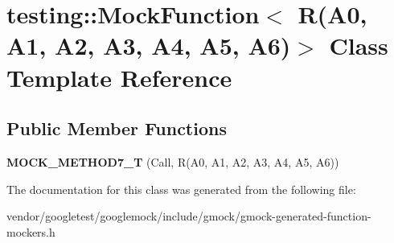 \hypertarget{classtesting_1_1_mock_function_3_01_r_07_a0_00_01_a1_00_01_a2_00_01_a3_00_01_a4_00_01_a5_00_01_a6_08_4}{}\section{testing\+:\+:Mock\+Function$<$ R(A0, A1, A2, A3, A4, A5, A6)$>$ Class Template Reference}
\label{classtesting_1_1_mock_function_3_01_r_07_a0_00_01_a1_00_01_a2_00_01_a3_00_01_a4_00_01_a5_00_01_a6_08_4}
\subsection*{Public Member Functions}
\begin{DoxyCompactItemize}
\item 
\mbox{\label{classtesting_1_1_mock_function_3_01_r_07_a0_00_01_a1_00_01_a2_00_01_a3_00_01_a4_00_01_a5_00_01_a6_08_4_a965d96b3e212c5bd0391302fcee943d6}} 
{\bfseries M\+O\+C\+K\+\_\+\+M\+E\+T\+H\+O\+D7\+\_\+T} (Call, R(A0, A1, A2, A3, A4, A5, A6))
\end{DoxyCompactItemize}


The documentation for this class was generated from the following file\+:\begin{DoxyCompactItemize}
\item 
vendor/googletest/googlemock/include/gmock/gmock-\/generated-\/function-\/mockers.\+h\end{DoxyCompactItemize}
